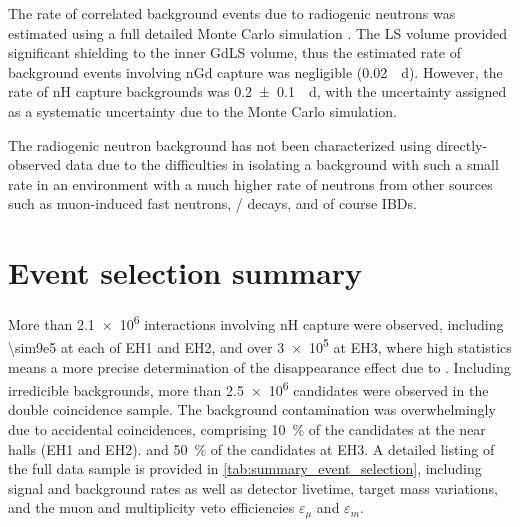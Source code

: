 
The rate of correlated background events due to radiogenic neutrons
was estimated using a full detailed Monte Carlo simulation \cite{rad_n}.
The LS volume provided significant shielding to the inner GdLS volume,
thus the estimated rate of background events involving nGd capture
was negligible (\SI{0.02}{\per\day}).
However, the rate of nH capture backgrounds was \SI{0.2\pm0.1}{\per\day},
with the uncertainty assigned as a systematic uncertainty
due to the Monte Carlo simulation.

The radiogenic neutron background has not been characterized
using directly-observed data
due to the difficulties in isolating a background with such a small rate
in an environment with a much higher rate of neutrons from other sources
such as muon-induced fast neutrons, \li{}/\he{} decays, and of course IBDs.

\section{Event selection summary}
\label{sec:event_selection_summary}

More than \num{2.1e6} \nuebar{} interactions involving nH capture were observed,
including \num{\sim9e5} at each of EH1 and EH2,
and over \num{3e5} at EH3, where high statistics means
a more precise determination of the disappearance effect due to \thetaot{}.
Including irredicible backgrounds, more than \num{2.5e6}
\nuebar{} candidates were observed in the double coincidence sample.
The background contamination was overwhelmingly due to accidental coincidences,
comprising \SI{10}{\percent} of the \nuebar{} candidates
at the near halls (EH1 and EH2).
and \SI{50}{\percent} of the \nuebar{} candidates at EH3.
A detailed listing of the full data sample is provided in
\cref{tab:summary_event_selection},
including signal and background rates
as well as detector livetime, target mass variations,
and the muon and multiplicity veto efficiencies $\varepsilon_\mu$ and $\varepsilon_m$.

